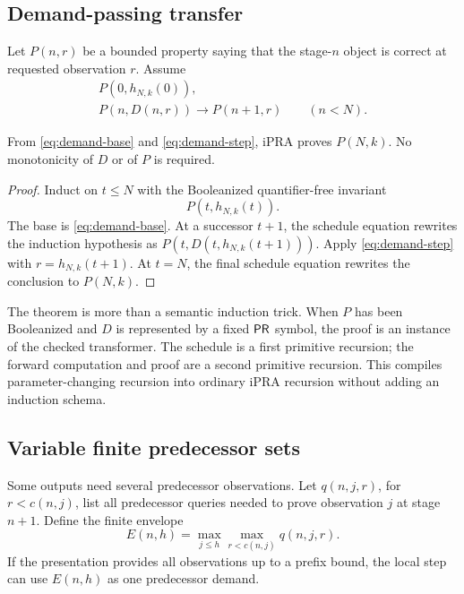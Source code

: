 \subsection{Demand-passing transfer}

Let \(P(n,r)\) be a bounded property saying that the stage-\(n\) object is
correct at requested observation \(r\).  Assume
\begin{align*}
 P(0,h_{N,k}(0)),\tag{Base}\label{eq:demand-base}\\
 P(n,D(n,r))\to P(n+1,r)\qquad(n<N).\tag{Step}\label{eq:demand-step}
\end{align*}

\begin{theorem}
\label{thm:demand-transfer}
From \eqref{eq:demand-base} and \eqref{eq:demand-step}, iPRA proves
\(P(N,k)\).  No monotonicity of \(D\) or of \(P\) is required.
\end{theorem}

\begin{proof}
Induct on \(t\le N\) with the Booleanized quantifier-free invariant
\[
  P(t,h_{N,k}(t)).
\]
The base is \eqref{eq:demand-base}.  At a successor \(t+1\), the schedule
equation rewrites the induction hypothesis as
\(P(t,D(t,h_{N,k}(t+1)))\).  Apply \eqref{eq:demand-step} with
\(r=h_{N,k}(t+1)\).  At \(t=N\), the final schedule equation rewrites the
conclusion to \(P(N,k)\).
\end{proof}

The theorem is more than a semantic induction trick.  When \(P\) has been
Booleanized and \(D\) is represented by a fixed \(\mathsf{PR}\) symbol, the proof is
an instance of the checked  transformer.
The schedule is a first primitive recursion; the forward computation and proof
are a second primitive recursion.  This compiles parameter-changing recursion
into ordinary iPRA recursion without adding an induction schema.

\subsection{Variable finite predecessor sets}

Some outputs need several predecessor observations.  Let
\(q(n,j,r)\), for \(r<c(n,j)\), list all predecessor queries needed to prove
observation \(j\) at stage \(n+1\).  Define the finite envelope
\[
 E(n,h)=\max_{j\le h}\max_{r<c(n,j)} q(n,j,r).
\]
If the presentation provides all observations up to a prefix bound, the local
step can use \(E(n,h)\) as one predecessor demand.

